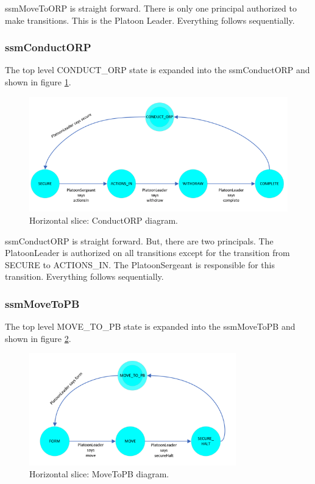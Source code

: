 \documentclass[../../main/main.tex]{subfiles}
\begin{document}
ssmMoveToORP is straight forward. There is only one principal authorized to make transitions.  This is the Platoon Leader.  Everything follows sequentially.  
\clearpage

\subsubsection{ssmConductORP}\label{sssec:ssmConductORP}
The top level CONDUCT_ORP state is expanded into the ssmConductORP  and shown in figure \ref{ssmConductORPDiagram}.


\begin{figure}[h!]
\centering
\includegraphics[width=\textwidth]{../figures/ssmConductORPDiagram}
\caption{\label{ssmConductORPDiagram} Horizontal slice: ConductORP diagram.}
\end{figure}

ssmConductORP is straight forward. But, there are two principals. The PlatoonLeader is authorized on all transitions except for the transition from SECURE to ACTIONS_IN.  The PlatoonSergeant is responsible for this transition.  Everything follows sequentially.  

\clearpage

\subsubsection{ssmMoveToPB}\label{sssec:ssmMoveToPB}
The top level MOVE_TO_PB state is expanded into the ssmMoveToPB  and shown in figure \ref{ssmMoveToPBDiagram}.

\begin{figure}[h!]
\centering
\includegraphics[width=0.8\textwidth]{../figures/ssmMoveToPBDiagram}
\caption{\label{ssmMoveToPBDiagram} Horizontal slice: MoveToPB diagram.}
\end{figure}
\end{document}
